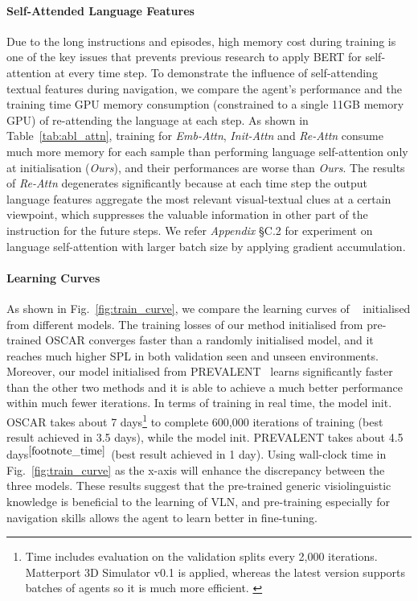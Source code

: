 \documentclass[final]{cvpr}
\begin{document}
\paragraph{Self-Attended Language Features}
Due to the long instructions and episodes, high memory cost during training is one of the key issues that prevents previous research to apply BERT for self-attention at every time step. To demonstrate the influence of self-attending textual features during navigation, we compare the agent's performance and the training time GPU memory consumption (constrained to a single 11GB memory GPU) of re-attending the language at each step. As shown in Table~\ref{tab:abl_attn}, training for \textit{Emb-Attn}, \textit{Init-Attn} and \textit{Re-Attn} consume much more memory for each sample than performing language self-attention only at initialisation (\textit{Ours}), and their performances are worse than \textit{Ours}. 
The results of \textit{Re-Attn} degenerates significantly because at each time step the output language features aggregate the most relevant visual-textual clues at a certain viewpoint, which suppresses the valuable information in other part of the instruction for the future steps. We refer \textit{Appendix} \S C.2 for experiment on language self-attention with larger batch size by applying gradient accumulation.




\paragraph{Learning Curves}
As shown in Fig.~\ref{fig:train_curve}, we compare the learning curves of \vlnbert~ initialised from different models. The training losses of our method initialised from pre-trained OSCAR \cite{li2020oscar} converges faster than a randomly initialised model, and it reaches much higher SPL in both validation seen and unseen environments. Moreover, our model initialised from PREVALENT~\cite{hao2020towards} learns significantly faster than the other two methods and it is able to achieve a much better performance within much fewer iterations. In terms of training in real time, the model init. OSCAR takes about 7 days\footnote{Time includes evaluation on the validation splits every 2,000 iterations. Matterport 3D Simulator v0.1 is applied, whereas the latest version supports batches of agents so it is much more efficient. \label{footnote_time}} to complete 600,000 iterations of training (best result achieved in 3.5 days), while the model init. PREVALENT takes about 4.5 days$^{\ref{footnote_time}}$ (best result achieved in 1 day). Using wall-clock time in Fig.~\ref{fig:train_curve} as the x-axis will enhance the discrepancy between the three models. These results suggest that the pre-trained generic visiolinguistic knowledge is beneficial to the learning of VLN, and pre-training especially for navigation skills allows the agent to learn better in fine-tuning.
\end{document}
